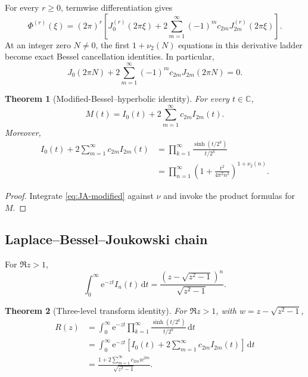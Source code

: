 \documentclass[11pt,oneside]{article}
\newtheorem{theorem}{Theorem}[section]
\theoremstyle{definition}
\newcommand{\dd}{\,\mathrm d}
\newcommand{\ee}{\mathrm e}
\newcommand{\vTwo}{\nu_2}
\begin{document}
For every \(r\ge0\), termwise differentiation gives
\begin{equation}
 \Phi^{(r)}(\xi)=(2\pi)^r\left[J_0^{(r)}(2\pi\xi)
 +2\sum_{m=1}^{\infty}(-1)^mc_{2m}J_{2m}^{(r)}(2\pi\xi)\right].
 \label{eq:Phi-Bessel-derivatives}
\end{equation}
At an integer zero \(N\ne0\), the first \(1+\vTwo(N)\) equations in this derivative ladder
become exact Bessel cancellation identities. In particular,
\begin{equation}
 J_0(2\pi N)+2\sum_{m=1}^{\infty}(-1)^mc_{2m}J_{2m}(2\pi N)=0.
 \label{eq:Bessel-integer-zero}
\end{equation}

\begin{theorem}[Modified-Bessel--hyperbolic identity]
\label{thm:Bessel-M}
For every \(t\in\mathbb C\),
\begin{equation}
 \boxed{\displaystyle
 M(t)=I_0(t)+2\sum_{m=1}^{\infty}c_{2m}I_{2m}(t).}
 \label{eq:M-Bessel}
\end{equation}
Moreover,
\begin{align}
 I_0(t)+2\sum_{m=1}^{\infty}c_{2m}I_{2m}(t)
 &=\prod_{k=1}^{\infty}\frac{\sinh(t/2^k)}{t/2^k}
 \label{eq:IBessel-hyperbolic}\\
 &=\prod_{n=1}^{\infty}\left(1+\frac{t^2}{4\pi^2n^2}\right)^{1+\vTwo(n)}.
 \label{eq:IBessel-canonical}
\end{align}
\end{theorem}

\begin{proof}
Integrate \eqref{eq:JA-modified} against \(\nu\) and invoke the product formulas for \(M\).
\end{proof}

\subsection{Laplace--Bessel--Joukowski chain}

For \(\Re z>1\),
\begin{equation}
 \int_0^{\infty}\ee^{-zt}I_n(t)\dd t
 =\frac{(z-\sqrt{z^2-1})^n}{\sqrt{z^2-1}}.
 \label{eq:Laplace-In}
\end{equation}

\begin{theorem}[Three-level transform identity]
\label{thm:Laplace-Bessel-Jouk}
For \(\Re z>1\), with \(w=z-\sqrt{z^2-1}\),
\begin{align}
 R(z)
 &=\int_0^{\infty}\ee^{-zt}
 \prod_{k=1}^{\infty}\frac{\sinh(t/2^k)}{t/2^k}\dd t
 \label{eq:R-Laplace-product-new}\\
 &=\int_0^{\infty}\ee^{-zt}\left[I_0(t)+2\sum_{m=1}^{\infty}c_{2m}I_{2m}(t)\right]\dd t
 \label{eq:R-Laplace-Bessel}\\
 &=\frac{1+2\sum_{m=1}^{\infty}c_{2m}w^{2m}}{\sqrt{z^2-1}}.
 \label{eq:R-Laplace-Jouk}
\end{align}
\end{theorem}
\end{document}
